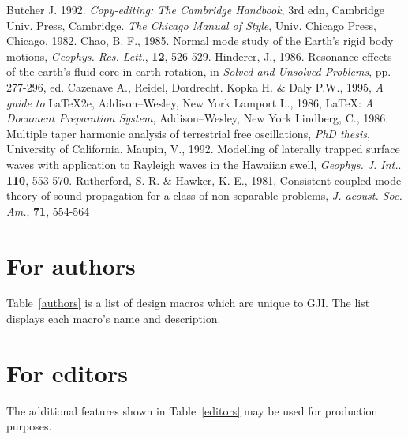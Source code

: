 \documentclass{gji}
\begin{document}
\begin{thebibliography}{}
    Butcher J. 1992. \textit{Copy-editing: The Cambridge
    Handbook}, 3rd edn, Cambridge Univ. Press, Cambridge.
   \textit{The Chicago Manual of Style}, Univ.
    Chicago Press, Chicago, 1982.
    Chao, B. F., 1985. Normal mode study of the Earth's rigid
     body motions, \textit{Geophys. Res. Lett.}, \textbf{12}, 526-529.
    Hinderer, J., 1986. Resonance effects of the earth's fluid
    core in earth rotation, in \textit{Solved and Unsolved
    Problems}, pp. 277-296, ed. Cazenave A., Reidel,
    Dordrecht.
    Kopka H. \& Daly P.W., 1995, \textit{A guide to} \LaTeX2e,
    Addison--Wesley, New York
    Lamport L., 1986,  \LaTeX: \textit{A Document
    Preparation System}, Addison--Wesley, New York
    Lindberg, C., 1986.  Multiple taper harmonic analysis of
    terrestrial free oscillations, \textit{PhD thesis},
    University of California.
    Maupin, V., 1992. Modelling of laterally trapped surface
    waves with application to Rayleigh waves in the Hawaiian
    swell, \textit{Geophys. J. Int.}. \textbf{110}, 553-570.
    Rutherford, S. R. \& Hawker, K. E., 1981,
    Consistent coupled mode theory of sound propagation for a
    class of non-separable problems,
   \textit{J. acoust. Soc. Am.}, \textbf{71}, 554-564
\end{thebibliography}


\appendix
\section{For authors}

Table~\ref{authors} is a list of design macros which are unique to GJI. The
list displays each macro's name and description.

\section{For editors}

The additional features shown in Table~\ref{editors} may be used for
production purposes.

\bsp %

\label{lastpage}
\end{document}
